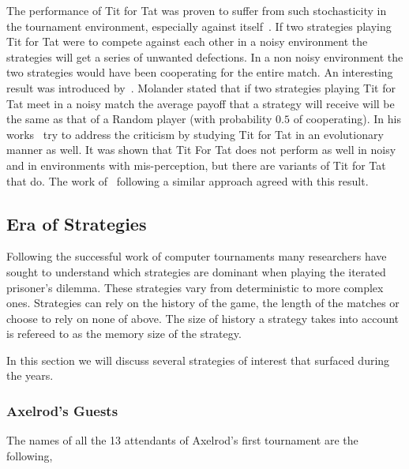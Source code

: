 \documentclass{article}
\begin{document}
The performance of Tit for Tat was proven to suffer from such stochasticity in
the tournament environment, especially against itself~\cite{Bendor1991,Godfray1992,
Molander1985, Nowak1992, Wolfgang2006}. If two strategies playing Tit for Tat were
to compete against each other in a noisy environment the strategies will get 
a series of unwanted defections. In a non noisy environment
the two strategies would have been cooperating for the entire match.
An interesting result was introduced by~\cite{Molander1985}. Molander stated
that if two strategies playing Tit for Tat meet in a noisy match the average
payoff that a strategy will receive will be the same as that of a Random player
(with probability \(0.5\) of cooperating).
In his works~\cite{axelrod1988} try to address the criticism by studying Tit for 
Tat in an evolutionary manner as well. It was shown that Tit For Tat does not 
perform as well in noisy and in environments with mis-perception, but there are 
variants of Tit for Tat that do. The work of~\cite{Nowak1990} following a similar
approach agreed with this result.


\subsection{Era of Strategies}

Following the successful work of computer tournaments many researchers have sought
to understand which strategies are dominant when playing the iterated prisoner's
dilemma. These strategies vary from deterministic to more complex ones.
Strategies can rely on the history of the game, the length of the matches or 
choose to rely on none of above. The size of history a strategy takes into account
is refereed to as the memory size of the strategy. 

In this section we will discuss several strategies of interest that surfaced
during the years.

\subsubsection{Axelrod's Guests}\label{subsection:axelrods_guests}

The names of all the 13 attendants of Axelrod's first tournament are the 
following, 
\end{document}
